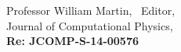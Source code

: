 \begin{letter}{Professor William Martin, \  Editor,\\
    Journal of Computational Physics,\\
\textbf{Re: JCOMP-S-14-00576}}
%
%


\end{letter}
